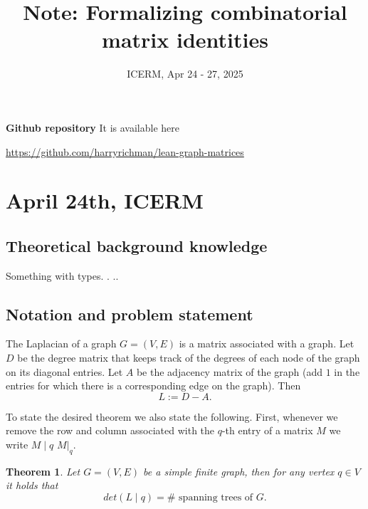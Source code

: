 \documentclass{article}
\title{Note:  Formalizing combinatorial matrix identities}
\author{} %
\date{ICERM, Apr 24 - 27, 2025}
\newtheorem{thm}{Theorem}
\theoremstyle{definition}
\begin{document}
\maketitle

\begin{abstract}

\end{abstract}

\noindent
\textbf{Github repository} It is available here
\begin{center}
    \url{https://github.com/harryrichman/lean-graph-matrices}
\end{center}

\section{April 24th, ICERM}

\subsection{Theoretical background knowledge}


Something with types. . .. 





\subsection{Notation and problem statement}

The Laplacian of a graph $G=(V,E)$ is a matrix associated with a graph. Let $D$ be the degree matrix that keeps track of the degrees of each node of the graph on its diagonal entries. Let $A$ be the adjacency matrix of the graph (add $1$ in the entries for which there is a corresponding edge on the graph). Then
\begin{equation}
    L:=D-A.
\end{equation}

To state the desired theorem we also state the following. First, whenever we remove the row and column associated with the $q$-th entry of a matrix $M$ we write $M\mid q$ $M |_{q}$.

\begin{thm}\label{Thm:main}
    Let $G=(V,E)$ be a simple finite graph, then for any vertex $q \in V$ it holds that
    \begin{equation}
        det(L\mid q)=\#\text{ spanning trees of }G.
    \end{equation}
\end{thm}
\end{document}
